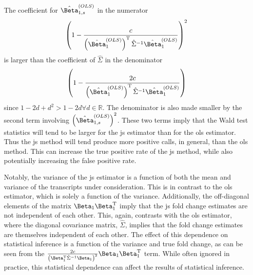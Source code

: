 %
The coefficient for $\hat{\Beta}_{1,s}^{(OLS)}$ in the numerator
\begin{equation}
  \left( 1 - \frac{ c }{ \left( \hat{\Beta}_1^{(OLS)} \right)^\tran \hat{\Sigma}^{-1} \hat{\Beta}_1^{(OLS)} } \right)^2
\end{equation}
%
is larger than the coefficient of $\hat{\Sigma}$ in the denominator
\begin{equation}
  \left(1 - \frac{2c}{ \left( \hat{\Beta}_1^{(OLS)} \right)^\tran \hat{\Sigma}^{-1} \hat{\Beta}_1^{(OLS)}} \right)
\end{equation}
%
since $1 - 2d + d^2 > 1 - 2d \forall d \in \mathbb{R}$.
The denominator is also made smaller by the second term involving $\left( \hat{\Beta}_{1,s}^{(OLS)} \right)^2$.
These two terms imply that the Wald test statistics will tend to be larger for the \gls{js} estimator than for the \gls{ols} estimator.
Thus the \gls{js} method will tend produce more positive calls, in general, than the \gls{ols} method.
This can increase the true positive rate of the \gls{js} method, while also potentially increasing the false positive rate.

Notably, the variance of the \gls{js} estimator is a function of both the mean and variance of the transcripts under consideration.
This is in contrast to the \gls{ols} estimator, which is solely a function of the variance.
Additionally, the off-diagonal elements of the matrix $\Beta_1 \Beta_1^\tran$ imply that the \gls{js} fold change estimates are not independent of each other.
This, again, contrasts with the \gls{ols} estimator, where the diagonal covariance matrix, $\hat{\Sigma}$, implies that the fold change estimates are themselves independent of each other.
The effect of this dependence on statistical inference is a function of the variance and true fold change, as can be seen from the $\frac{2c}{\left( \Beta_1^\tran \hat{\Sigma}^{-1} \Beta_1 \right)^2} \Beta_1 \Beta_1^\tran$ term.
While often ignored in practice, this statistical dependence can affect the results of statistical inference.
